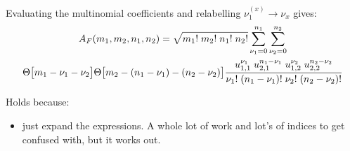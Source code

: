 \documentclass[
	english,
	a4paper,
	fontsize=10pt,
	parskip=half,
	titlepage=true,
	DIV=12,
	final
]{scrreprt}
\newcommand*{\thus}{\ensuremath{\rightarrow}\xspace}
\begin{document}
Evaluating the multinomial coefficients and relabelling $\nu_1^{(x)} \thus \nu_x$ gives:
\begin{multline}
	A_F (m_1, m_2, n_1, n_2)
=
	\sqrt{m_1! \; m_2! \; n_1! \; n_2!}
	\sum_{\nu_1=0}^{n_1}
	\sum_{\nu_2=0}^{n_2}
\\
	\Theta\qty[ \big. m_1 - \nu_1 - \nu_2 ]
	\Theta\qty[ \big. m_2 - \qty(n_1 - \nu_1)  - \qty(n_2 - \nu_2) ]
	\frac
		{u_{1,1}^{\nu_1} \; u_{2,1}^{n_1 - \nu_1} \;
		 u_{1,2}^{\nu_2} \; u_{2,2}^{n_2 - \nu_2}}
		{\nu_1! \; (n_1 - \nu_1)! \;
		 \nu_2! \; (n_2 - \nu_2)!}		
\end{multline}

Holds because:
\begin{itemize}
\item just expand the expressions. A whole lot of work and lot's of indices to get confused with, but it works out.
\end{itemize}
\end{document}
